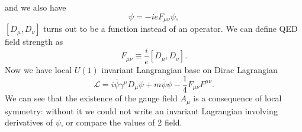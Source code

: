 \documentclass{report}
\numberwithin{equation}{section}
\begin{document}
and we also have
\begin{equation}
[D_\mu ,D_\nu]\psi= -ie F_{\mu\nu} \psi,
\end{equation}
$[D_\mu ,D_\nu]$ turns out to be a function instead of an operator. We can define QED field strength as
\begin{equation}
F_{\mu\nu}\equiv \frac{i}{e}[D_\mu ,D_\nu].
\end{equation}
Now we have local $U(1)$ invariant Langrangian base on Dirac Lagrangian
\begin{equation}
\mathcal{L}=i\overline{\psi}\gamma^\mu D_\mu \psi+m\overline{\psi}\psi
-\frac{1}{4} F_{\mu \nu} F^{\mu \nu}.
\end{equation}
We can see that the existence of the 
gauge field $A_\mu$ is a consequence of local symmetry: without it we could not 
write an invariant Lagrangian involving derivatives of $\psi$, or compare the values of 2 field.
\end{document}
